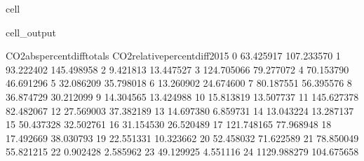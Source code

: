 \documentclass[letterpaper,10pt,english]{jupyterBook}
\begin{document}
\begin{sphinxuseclass}{cell}
\begin{sphinxVerbatimOutput}
\begin{sphinxuseclass}{cell_output}
\begin{sphinxVerbatim}[commandchars=\\\{\}]
    CO2\PYGZus{}abs\PYGZus{}percent\PYGZus{}diff\PYGZus{}totals  CO2\PYGZus{}relative\PYGZus{}percent\PYGZus{}diff\PYGZus{}2015  \PYGZbs{}
0                     63.425917                     \PYGZhy{}107.233570   
1                     93.222402                     \PYGZhy{}145.498958   
2                      9.421813                      \PYGZhy{}13.447527   
3                    124.705066                       79.277072   
4                     70.153790                       46.691296   
5                     32.086209                      \PYGZhy{}35.798018   
6                     13.260902                       24.674600   
7                     80.187551                       56.395576   
8                     36.874729                       30.212099   
9                     14.304565                      \PYGZhy{}13.424988   
10                    15.813819                       13.507737   
11                   145.627378                       82.482067   
12                    27.569003                       37.382189   
13                    14.697380                       \PYGZhy{}6.859731   
14                    13.043224                       13.287137   
15                    50.437328                       32.502761   
16                    31.154530                      \PYGZhy{}26.520489   
17                   121.748165                       77.968948   
18                    17.492669                      \PYGZhy{}38.030793   
19                    22.551331                       10.323662   
20                    52.458032                      \PYGZhy{}71.622589   
21                    78.850049                       55.821215   
22                     0.902428                        2.585962   
23                    49.129925                        4.551116   
24                  1129.988279                      104.675658   


\end{sphinxVerbatim}
\end{sphinxuseclass}
\end{sphinxVerbatimOutput}
\end{sphinxuseclass}
\end{document}
